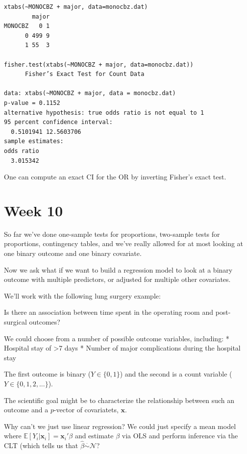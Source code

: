 \documentclass[
  letterpaper,
  DIV=11,
  numbers=noendperiod]{scrreport}
\begin{document}
\begin{verbatim}
xtabs(~MONOCBZ + major, data=monocbz.dat)
        major
MONOCBZ   0 1
      0 499 9
      1 55  3

fisher.test(xtabs(~MONOCBZ + major, data=monocbz.dat))
      Fisher’s Exact Test for Count Data

data: xtabs(~MONOCBZ + major, data = monocbz.dat)
p-value = 0.1152
alternative hypothesis: true odds ratio is not equal to 1
95 percent confidence interval:
  0.5101941 12.5603706
sample estimates:
odds ratio
  3.015342
\end{verbatim}

One can compute an exact CI for the OR by inverting Fisher's exact test.


\hypertarget{week-10}{%
\chapter{Week 10}\label{week-10}}

So far we've done one-sample tests for proportions, two-sample tests for
proportions, contingency tables, and we've really allowed for at most
looking at one binary outcome and one binary covariate.

Now we ask what if we want to build a regression model to look at a
binary outcome with multiple predictors, or adjusted for multiple other
covariates.

We'll work with the following lung surgery example:

Is there an association between time spent in the operating room and
post-surgical outcomes?

We could choose from a number of possible outcome variables, including:
* Hospital stay of \textgreater7 days * Number of major complications
during the hospital stay

The first outcome is binary (\(Y \in \{ 0, 1 \}\)) and the second is a
count variable (\(Y \in \{ 0, 1, 2, ... \}\)).

The scientific goal might be to characterize the relationship between
such an outcome and a \(p\)-vector of covariatets, \(\mathbf{x}\).

Why can't we just use linear regression? We could just specify a mean
model where \(\mathbb E[Y_i | \mathbf{x}_i] = \mathbf{x}_i' \beta\) and
estimate \(\beta\) via OLS and perform inference via the CLT (which
tells us that \(\hat \beta \stackrel{\cdot}{\sim} \mathcal N\)?
\end{document}
